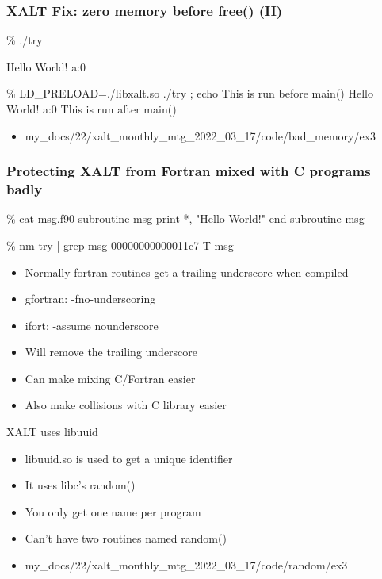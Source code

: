 \documentclass{beamer}
\begin{document}
\begin{frame}[fragile]
    \frametitle{XALT Fix: zero memory before free() (II)}
 {\small
   \begin{semiverbatim}
\% ./try

Hello World! {\color{blue} a:0}

\% LD_PRELOAD=./libxalt.so  ./try  ; echo
This is run before main()
Hello World! {\color{blue} a:0}
This is run after main()
    \end{semiverbatim}
}
  \begin{itemize}
    \item my\_docs/22/xalt\_monthly\_mtg\_2022\_03\_17/code/bad\_memory/ex3
  \end{itemize}
\end{frame}


\begin{frame}[fragile]
    \frametitle{Protecting XALT from Fortran mixed with C programs badly}
 {\tiny
    \begin{semiverbatim}
\% cat msg.f90
subroutine msg
   print *, "Hello World!"
end subroutine msg

\% nm try | grep msg
00000000000011c7 T msg_
    \end{semiverbatim}
}
  \begin{itemize}
    \item Normally fortran routines get a trailing underscore
      when compiled
    \item gfortran: -fno-underscoring
    \item ifort:    -assume nounderscore
    \item Will remove the trailing underscore
    \item Can make mixing C/Fortran easier
    \item Also make collisions with C library easier
  \end{itemize}
\end{frame}

\begin{frame}{XALT uses libuuid}
  \begin{itemize}
    \item libuuid.so is used to get a unique identifier
    \item It uses libc's random()
    \item You only get one name per program
    \item Can't have two routines named random() 
    \item my\_docs/22/xalt\_monthly\_mtg\_2022\_03\_17/code/random/ex3


  \end{itemize}
\end{frame}
\end{document}
